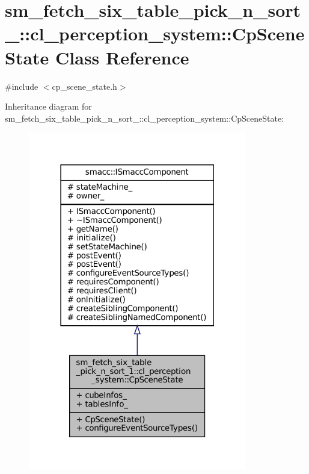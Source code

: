 \hypertarget{classsm__fetch__six__table__pick__n__sort__1_1_1cl__perception__system_1_1CpSceneState}{}\section{sm\+\_\+fetch\+\_\+six\+\_\+table\+\_\+pick\+\_\+n\+\_\+sort\+\_\+:\+:cl\+\_\+perception\+\_\+system\+:\+:Cp\+Scene\+State Class Reference}
\label{classsm__fetch__six__table__pick__n__sort__1_1_1cl__perception__system_1_1CpSceneState}


{\ttfamily \#include $<$cp\+\_\+scene\+\_\+state.\+h$>$}



Inheritance diagram for sm\+\_\+fetch\+\_\+six\+\_\+table\+\_\+pick\+\_\+n\+\_\+sort\+\_\+:\+:cl\+\_\+perception\+\_\+system\+:\+:Cp\+Scene\+State\+:
\nopagebreak
\begin{figure}[H]
\begin{center}
\leavevmode
\includegraphics[width=271pt]{classsm__fetch__six__table__pick__n__sort__1_1_1cl__perception__system_1_1CpSceneState__inherit__graph}
\end{center}
\end{figure}


